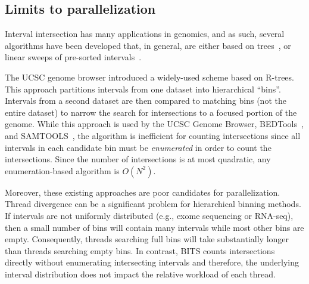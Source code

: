 \documentclass{bioinfo}
\begin{document}
\subsection{Limits to parallelization}

Interval intersection has many applications in genomics, and as such, several
algorithms have been developed that, in general, are either based on
trees~\citep{kent2002,alekseyenko2007}, or linear sweeps of
pre-sorted intervals~\citep{richardson2006}.

The UCSC genome browser introduced a widely-used scheme based on
R-trees. This approach partitions intervals from one dataset into
hierarchical ``bins''.  Intervals from a second dataset are then compared 
to matching bins (not the entire dataset) to narrow the search
for intersections to a focused portion of the genome.  While this 
approach is used by the UCSC Genome Browser, BEDTools~\citep{quinlan2010},
and SAMTOOLS~\citep{li2009}, the algorithm is inefficient for counting 
intersections since all intervals in each candidate bin must be
\emph{enumerated} in order to count the intersections.  Since the number of
intersections is at most quadratic, any enumeration-based algorithm is
$O(N^2)$.
 
Moreover, these existing approaches are poor candidates for parallelization.
Thread divergence can be a significant problem for hierarchical binning methods.  
If intervals are not uniformly distributed
(e.g., exome sequencing or RNA-seq), then a small number of bins will contain
many intervals while most other bins are empty. 
Consequently, threads searching full
bins will take substantially longer than threads searching empty bins.  In
contrast, BITS counts intersections directly without enumerating
intersecting intervals and therefore, the underlying interval distribution does
not impact the relative workload of each thread.

\end{document}
